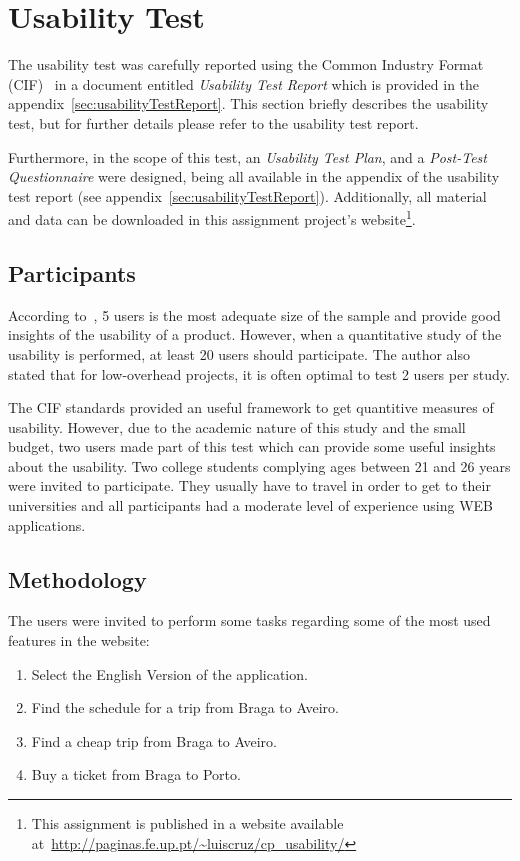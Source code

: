 \documentclass[a4paper]{article}
\begin{document}
\section{Usability Test}
\label{sec:usability_test}

The usability test was carefully reported using the Common Industry Format (CIF)~\citep{iusr2006cif} in a document entitled \emph{Usability Test Report} which is provided in the appendix~\ref{sec:usabilityTestReport}. This section briefly describes the usability test, but for further details please refer to the usability test report.

Furthermore, in the scope of this test, an \emph{Usability Test Plan}, and a \emph{Post-Test Questionnaire} were designed, being all available in the appendix of the usability test report (see appendix~\ref{sec:usabilityTestReport}). Additionally, all material and data can be downloaded in this assignment project's website\footnote{This assignment is published in a website available at~\url{http://paginas.fe.up.pt/~luiscruz/cp_usability/}}.

\subsection{Participants} According to~\citet{nielsen2012many}, 5 users is the most adequate size of the sample and provide good insights of the usability of a product. However, when a quantitative study of the usability is performed, at least 20 users should participate. The author also stated that for low-overhead projects, it is often optimal to test 2 users per study.

The CIF standards provided an useful framework to get quantitive measures of usability. However, due to the academic nature of this study and the small budget, two users made part of this test which can provide some useful insights about the usability. Two college students complying ages between 21 and 26 years were invited to participate. They usually have to travel in order to get to their universities and all participants had a moderate level of experience using WEB applications. 


\begin{samepage}
\subsection{Methodology} The users were invited to perform some tasks regarding some of the most used features in the website:

\begin{enumerate}
  \item Select the English Version of the application.
  \item Find the schedule for a trip from Braga to Aveiro.
  \item Find a cheap trip from Braga to Aveiro.
  \item Buy a ticket from Braga to Porto.
\end{enumerate}
\end{samepage}
\end{document}
